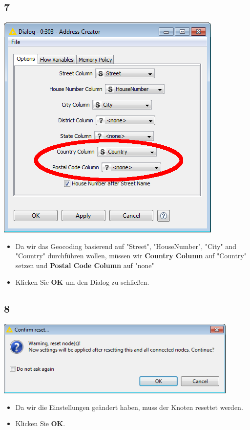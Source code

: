 \documentclass{beamer}
\begin{document}
\subsection{7}
\begin{frame}
	\begin{center}
  		\includegraphics[height=0.5\textheight]{7.png}
	\end{center}
	\begin{itemize}
		\item Da wir das Geocoding basierend auf "Street", "HouseNumber", "City" and "Country" durchführen wollen, müssen wir \textbf{Country Column} auf "Country" setzen und \textbf{Postal Code Column} auf "none"
		\item Klicken Sie \textbf{OK} um den Dialog zu schließen.
	\end{itemize}
\end{frame}

\subsection{8}
\begin{frame}
	\begin{center}
  		\includegraphics[width=0.9\textwidth]{8.png}
	\end{center}
	\begin{itemize}
		\item Da wir die Einstellungen geändert haben, muss der Knoten resettet werden. 
		\item Klicken Sie \textbf{OK}.
	\end{itemize}
\end{frame}
\end{document}
